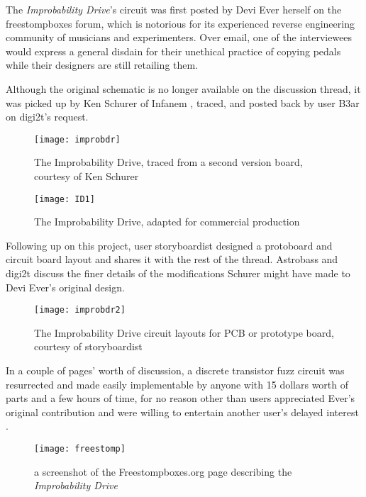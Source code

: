 The \textit{Improbability Drive}'s circuit was first posted by Devi Ever herself on the freestompboxes forum, which is notorious for its experienced reverse engineering community of musicians and experimenters\citep{freestomp}. Over email, one of the interviewees would express a general disdain for their unethical practice of copying pedals while their designers are still retailing them. 

Although the original schematic is no longer available on the discussion thread, it was picked up by Ken Schurer of Infanem \citep{infanem}, traced, and posted back by user B3ar on digi2t's request. 

	\begin{figure}[H]
	  \centering
	    \texttt{[image: improbdr]}
	    \caption{The Improbability Drive, traced from a second version board, courtesy of Ken Schurer}
	\end{figure}
	
	\begin{figure}[H]
	  \centering
	    \texttt{[image: ID1]}
	    \caption{The Improbability Drive, adapted for commercial production \citep{infanem}}
	\end{figure}
	
Following up on this project, user storyboardist designed a protoboard and circuit board layout and shares it with the rest of the thread. Astrobass and digi2t discuss the finer details of the modifications Schurer might have made to Devi Ever's original design. 

	\begin{figure}[H]
	  \centering
	    \texttt{[image: improbdr2]}
	    \caption{The Improbability Drive circuit layouts for PCB or prototype board, courtesy of storyboardist}
	\end{figure}

In a couple of pages' worth of discussion, a discrete transistor fuzz circuit was resurrected and made easily implementable by anyone with 15 dollars worth of parts and a few hours of time, for no reason other than users appreciated Ever's original contribution and were willing to entertain another user's delayed interest \citep{freestomp}.

\begin{figure}[H]
	  \centering
	    \texttt{[image: freestomp]}
	    \caption{a screenshot of the Freestompboxes.org page describing the \textit{Improbability Drive} \citep{freestomp}}
	\end{figure}

